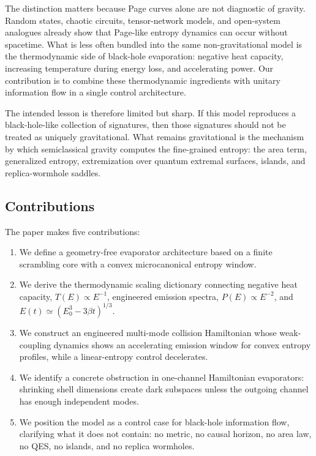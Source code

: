 The distinction matters because Page curves alone are not diagnostic of gravity. Random states, chaotic circuits, tensor-network models, and open-system analogues already show that Page-like entropy dynamics can occur without spacetime. What is less often bundled into the same non-gravitational model is the thermodynamic side of black-hole evaporation: negative heat capacity, increasing temperature during energy loss, and accelerating power. Our contribution is to combine these thermodynamic ingredients with unitary information flow in a single control architecture.

The intended lesson is therefore limited but sharp. If this model reproduces a black-hole-like collection of signatures, then those signatures should not be treated as uniquely gravitational. What remains gravitational is the mechanism by which semiclassical gravity computes the fine-grained entropy: the area term, generalized entropy, extremization over quantum extremal surfaces, islands, and replica-wormhole saddles.

\subsection{Contributions}

The paper makes five contributions:
\begin{enumerate}[leftmargin=*]
\item We define a geometry-free evaporator architecture based on a finite scrambling core with a convex microcanonical entropy window.
\item We derive the thermodynamic scaling dictionary connecting negative heat capacity, $T(E)\propto E^{-1}$, engineered emission spectra, $P(E)\propto E^{-2}$, and $E(t)\simeq(E_0^3-3\beta t)^{1/3}$.
\item We construct an engineered multi-mode collision Hamiltonian whose weak-coupling dynamics shows an accelerating emission window for convex entropy profiles, while a linear-entropy control decelerates.
\item We identify a concrete obstruction in one-channel Hamiltonian evaporators: shrinking shell dimensions create dark subspaces unless the outgoing channel has enough independent modes.
\item We position the model as a control case for black-hole information flow, clarifying what it does not contain: no metric, no causal horizon, no area law, no QES, no islands, and no replica wormholes.
\end{enumerate}
